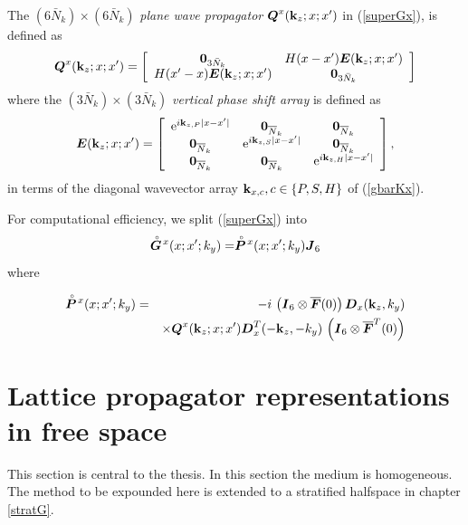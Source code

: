 The $(6\bar{N}_k)\times (6\bar{N}_k)$ {\em plane wave propagator\/} 
${\mbox{\boldmath$\mit Q$\unboldmath}}^{x}({\bf k}_{z};x;x^{\prime})$ in (\ref{superGx}),
is defined  as
\begin{equation} \label{gQxdef}
{\mbox{\boldmath$\mit Q$\unboldmath}}^{x}({\bf k}_z;x;x^{\prime})=
\left[{\begin{array}{cc}{\bf 0}_{3\bar{N}_k}&H(x-{x}^{\prime}){\mbox{\boldmath$\mit E$\unboldmath}}({\bf 
k}_z;x;{x}^{\prime})\\
H(x^{\prime}-{x}){\mbox{\boldmath$\mit E$\unboldmath}}({\bf k}_z;x;{x}^{\prime})&{\bf 0}_{3\bar{N}_k}\end{array}}\right]
\end{equation}
where the $(3\bar{N}_k)\times (3\bar{N}_k)$ {\em vertical phase shift array\/} is 
defined as
\[
{\mbox{\boldmath$\mit E$\unboldmath}}({\bf k}_z;x;{x}^{\prime})=\left[{\begin{array}{ccc}
{\rm e}^{i{\bf k}_{z,P}|x-{x}^{\prime}|}&{\bf 0}_{\overline{N}_k}&{\bf 0}_{\overline{N}_k}\\ 
{\bf 0}_{\overline{N}_k}&{\rm e}^{ 
i{\bf k}_{z,S}|x-{x}^{\prime}|}&{\bf 0}_{\overline{N}_k}\\ {\bf 0}_{\overline{N}_k}&{\bf 0}_{\overline{N}_k}&
{\rm e}^{ 
i{\bf k}_{z,H}|x-{x}^{\prime}|}\end{array}}\right] ,
\]
in terms of the diagonal wavevector array ${\bf k}_{x,c}, c\in\{P,S,H  
\}$ of (\ref{gbarKx}).

For computational efficiency, we split (\ref{superGx}) into
\[
\stackrel{\scriptscriptstyle _{\,\,\circ}}{ \mbox{\boldmath$\mit G$\unboldmath}}\!{}^{x}({ x};{ x}^{\prime};k_y)=\stackrel{\scriptscriptstyle _{\,\,\circ}}{ \mbox{\boldmath$\mit P$\unboldmath}}\!{}^{x}({ x};{ x}^{\prime};k_y){\mbox{\boldmath$\mit J$\unboldmath}}_6
\]
where
\begin{samepage}
\begin{eqnarray} \label{superPx}
\stackrel{\scriptscriptstyle _{\,\,\circ}}{ \mbox{\boldmath$\mit P$\unboldmath}}\!{}^{x}({ x};{ x}^{\prime};k_y)
&=&- i\, 
\left({\mbox{\boldmath$\mit I$\unboldmath}}_6\otimes \overline{\mbox{\boldmath$\mit F$\unboldmath}}(0)  \right)
 {\mbox{\boldmath$\mit D$\unboldmath}}_{x}({\bf k}_{z},{k}_{y})\nonumber\\
&&\times
{\mbox{\boldmath$\mit Q$\unboldmath}}^{x}({\bf k}_{z};x;x^{\prime}){\mbox{\boldmath$\mit D$\unboldmath}}_{x}^{T}(-{\bf k}_{z},-{k}_{y})
\,\left({\mbox{\boldmath$\mit I$\unboldmath}}_6\otimes \overline{\mbox{\boldmath$\mit F$\unboldmath}}^{T}(0)  \right)
\end{eqnarray} 
\end{samepage}




\section{Lattice propagator representations in free space} \label{latticeP}
This section is central to the thesis. In this section the medium is 
homogeneous. The method to be expounded here is extended to a stratified 
halfspace in chapter \ref{stratG}. 

